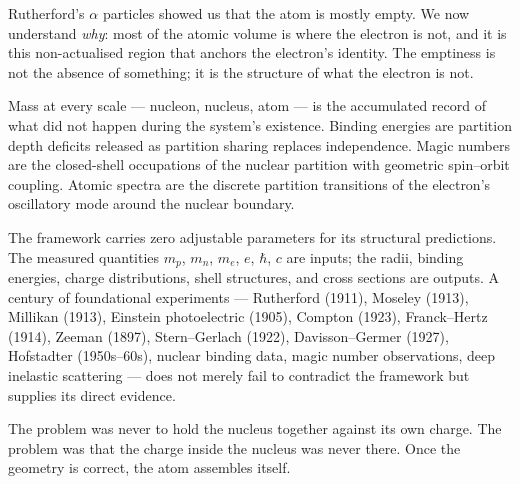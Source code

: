 \documentclass[11pt,a4paper]{article}
\theoremstyle{definition}
\theoremstyle{remark}
\begin{document}
Rutherford's $\alpha$ particles showed us that the atom is mostly empty. We now understand \emph{why}: most of the atomic volume is where the electron is not, and it is this non-actualised region that anchors the electron's identity. The emptiness is not the absence of something; it is the structure of what the electron is not.

Mass at every scale --- nucleon, nucleus, atom --- is the accumulated record of what did not happen during the system's existence. Binding energies are partition depth deficits released as partition sharing replaces independence. Magic numbers are the closed-shell occupations of the nuclear partition with geometric spin--orbit coupling. Atomic spectra are the discrete partition transitions of the electron's oscillatory mode around the nuclear boundary.

The framework carries zero adjustable parameters for its structural predictions. The measured quantities $m_p$, $m_n$, $m_e$, $e$, $\hbar$, $c$ are inputs; the radii, binding energies, charge distributions, shell structures, and cross sections are outputs. A century of foundational experiments --- Rutherford (1911), Moseley (1913), Millikan (1913), Einstein photoelectric (1905), Compton (1923), Franck--Hertz (1914), Zeeman (1897), Stern--Gerlach (1922), Davisson--Germer (1927), Hofstadter (1950s--60s), nuclear binding data, magic number observations, deep inelastic scattering --- does not merely fail to contradict the framework but supplies its direct evidence.

The problem was never to hold the nucleus together against its own charge. The problem was that the charge inside the nucleus was never there. Once the geometry is correct, the atom assembles itself.


\end{document}
